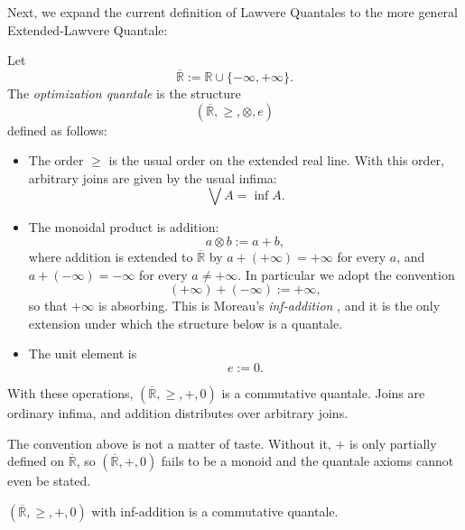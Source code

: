 Next, we expand the current definition of Lawvere Quantales to the more general
Extended-Lawvere Quantale:

\begin{definition}
	Let
	\[
		\overline{\mathbb{R}} := \mathbb{R} \cup \{-\infty,+\infty\}.
	\]
	The \emph{optimization quantale} is the structure
	\[
		(\overline{\mathbb{R}},\geq,\otimes,e)
	\]
	defined as follows:

	\begin{itemize}
		\item The order $\geq$ is the usual order on the extended real line.
		      With this order, arbitrary joins are given by the usual infima:
		      \[
			      \bigvee A = \inf A.
		      \]

		\item The monoidal product is addition:
		      \[
			      a \otimes b := a + b,
		      \]
		      where addition is extended to $\overline{\mathbb{R}}$ by
		      $a + (+\infty) = +\infty$ for every $a$, and
		      $a + (-\infty) = -\infty$ for every $a \neq +\infty$.
		      In particular we adopt the convention
		      \[
			      (+\infty) + (-\infty) := +\infty,
		      \]
		      so that $+\infty$ is absorbing. This is Moreau's
		      \emph{inf-addition} \cite{rockafellar1970convex}, and it is the
		      only extension under which the structure below is a quantale.

		\item The unit element is
		      \[
			      e := 0.
		      \]
	\end{itemize}

	With these operations,
	$(\overline{\mathbb{R}},\geq,+,0)$
	is a commutative quantale. Joins are ordinary infima,
	and addition distributes over arbitrary joins.
\end{definition}

The convention above is not a matter of taste. Without it, $+$ is only
partially defined on $\overline{\mathbb{R}}$, so
$(\overline{\mathbb{R}},+,0)$ fails to be a monoid and the quantale axioms
cannot even be stated. 

\begin{proposition}
	$(\overline{\mathbb{R}},\geq,+,0)$ with inf-addition is a commutative
	quantale.
\end{proposition}

